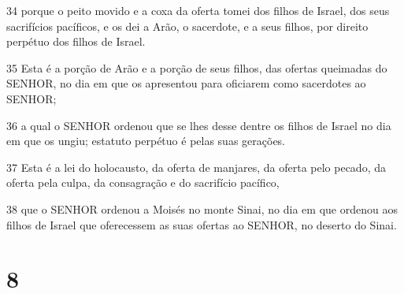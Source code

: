 \par 34 porque o peito movido e a coxa da oferta tomei dos filhos de Israel, dos seus sacrifícios pacíficos, e os dei a Arão, o sacerdote, e a seus filhos, por direito perpétuo dos filhos de Israel.
\par 35 Esta é a porção de Arão e a porção de seus filhos, das ofertas queimadas do SENHOR, no dia em que os apresentou para oficiarem como sacerdotes ao SENHOR;
\par 36 a qual o SENHOR ordenou que se lhes desse dentre os filhos de Israel no dia em que os ungiu; estatuto perpétuo é pelas suas gerações.
\par 37 Esta é a lei do holocausto, da oferta de manjares, da oferta pelo pecado, da oferta pela culpa, da consagração e do sacrifício pacífico,
\par 38 que o SENHOR ordenou a Moisés no monte Sinai, no dia em que ordenou aos filhos de Israel que oferecessem as suas ofertas ao SENHOR, no deserto do Sinai.

\chapter{8}

